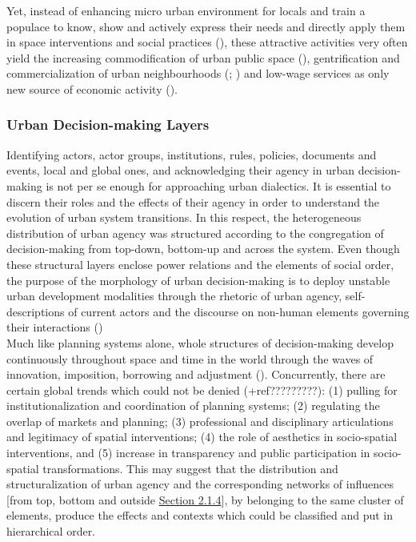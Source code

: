 \documentclass[11pt]{report}
\begin{document}
Yet, instead of enhancing micro urban environment for locals and train a populace to know, show and actively express their needs and directly apply them in space interventions and social practices
(\href{Ostrom}{\citealt{ostrom_governing_1995}}),
these attractive activities very often yield the increasing commodification of urban public space
(\href{Lehrer}{\citealt{lehrer_old_2008}}),
gentrification and commercialization of urban neighbourhoods
(\href{Zukin}{\citealt{zukin_cultures_1995}}; \href{Lloyd}{\citealt{lloyd_XXX_2006}})
and low-wage services as only new source of economic activity
(\href{Basett}{\citealt{basett_XXXX_1993}}).

\subsubsection{Urban Decision-making Layers}

Identifying actors, actor groups, institutions, rules, policies, documents and events, local and global ones, and acknowledging their agency in urban decision-making is not per se enough for approaching urban dialectics.
It is essential to discern their roles and the effects of their agency in order to understand the evolution of urban system transitions.
In this respect, the heterogeneous distribution of urban agency was structured according to the congregation of decision-making from top-down, bottom-up and across the system.
Even though these structural layers enclose power relations and the elements of social order, the purpose of the morphology of urban decision-making is to deploy unstable urban development modalities 
through the rhetoric of urban agency, self-descriptions of current actors and the discourse on non-human elements governing their interactions (\href{Van}{\citealt{van_assche_co-evolutions_2013}})
\\

Much like planning systems alone, whole structures of decision-making develop continuously throughout space and time in the world through the waves of innovation,  imposition,  borrowing  and  adjustment
(\href{Nedovic}{\citealt{nedovicbudic_waves_2006}}).
Concurrently, there are certain global trends which could not be denied
(\href{Van}{\citealt{van_assche_co-evolutions_2013}}+ref?????????):
(1) pulling for institutionalization and coordination of planning systems;
(2) regulating the overlap of markets and planning;
(3) professional and disciplinary articulations and legitimacy of spatial interventions;
(4) the role of aesthetics in socio-spatial interventions, and
(5) increase in transparency and public participation in socio-spatial transformations.
This may suggest that the distribution and structuralization of urban agency and the corresponding networks of influences [from top, bottom and outside
\href{Section 2.1.4}{Section 2.1.4}], by belonging to the same cluster of elements, produce the effects and contexts which could be classified and put in hierarchical order. 
\\
\end{document}
